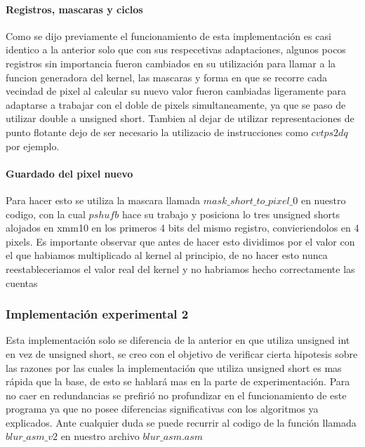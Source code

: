 \paragraph{Registros, mascaras y ciclos}

Como se dijo previamente el funcionamiento de esta implementación es casi identico a la anterior solo que con sus respecetivas adaptaciones, algunos pocos registros sin importancia fueron cambiados en su utilización para llamar a la funcion generadora del kernel, las mascaras y forma en que se recorre cada vecindad de pixel al calcular su nuevo valor fueron cambiadas ligeramente para adaptarse a trabajar con el doble de pixels simultaneamente, ya que se paso de utilizar double a unsigned short. Tambien al dejar de utilizar representaciones de punto flotante dejo de ser necesario la utilizacio de instrucciones como $cvtps2dq$ por ejemplo.

\paragraph{Guardado del pixel nuevo}

Para hacer esto se utiliza la mascara llamada $mask\_short\_to\_pixel\_0$ en nuestro codigo, con la cual $pshufb$ hace su trabajo y posiciona lo tres unsigned shorts alojados en xmm10 en los primeros 4 bits del mismo registro, convieriendolos en 4 pixels. Es importante observar que antes de hacer esto dividimos por el valor con el que habiamos multiplicado al kernel al principio, de no hacer esto nunca reestableceriamos el valor real del kernel y no habriamos hecho correctamente las cuentas

\subsubsection{Implementación experimental 2}

Esta implementación solo se diferencia de la anterior en que utiliza unsigned int en vez de unsigned short, se creo con el objetivo de verificar cierta hipotesis sobre las razones por las cuales la implementación que utiliza unsigned short es mas rápida que la base, de esto se hablará mas en la parte de experimentación. Para no caer en redundancias se prefirió no profundizar en el funcionamiento de este programa ya que no posee diferencias significativas con los algoritmos ya explicados. Ante cualquier duda se puede recurrir al codigo de la función llamada $blur\_asm\_v2$ en nuestro archivo $blur\_asm.asm$

